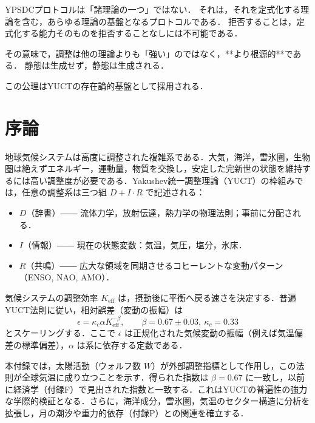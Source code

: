\documentclass[11pt,a4paper]{article}
\newcommand{\Keff}{K_{\mathrm{eff}}}
\newcommand{\kappac}{\kappa_c}
\newcommand{\be}{\beta}
\begin{document}
	YPSDCプロトコルは「諸理論の一つ」ではない．
	それは，それを定式化する理論を含む，あらゆる理論の基盤となるプロトコルである．
	拒否することは，定式化する能力そのものを拒否することなしには不可能である．
	
	その意味で，調整は他の理論よりも「強い」のではなく，**より根源的**である．
	静態は生成せず，静態は生成される．
	
	この公理はYUCTの存在論的基盤として採用される．
	
	\section{序論}
	
	地球気候システムは高度に調整された複雑系である．大気，海洋，雪氷圏，生物圏は絶えずエネルギー，運動量，物質を交換し，安定した完新世の状態を維持するには高い調整度が必要である．Yakushev統一調整理論（YUCT）の枠組みでは，任意の調整系は三つ組 $D + I \cdot R$ で記述される：
	
	\begin{itemize}
		\item $D$（辞書）―― 流体力学，放射伝達，熱力学の物理法則；事前に分配される．
		\item $I$（情報）―― 現在の状態変数：気温，気圧，塩分，氷床．
		\item $R$（共鳴）―― 広大な領域を同期させるコヒーレントな変動パターン（ENSO, NAO, AMO）．
	\end{itemize}
	
	気候システムの調整効率 $\Keff$ は，摂動後に平衡へ戻る速さを決定する．普遍YUCT法則に従い，相対誤差（変動の振幅）は
	\[
	\epsilon = \kappac \alpha \Keff^{-\be}, \qquad \be = 0.67 \pm 0.03,\ \kappac = 0.33
	\]
	とスケーリングする．ここで $\epsilon$ は正規化された気候変動の振幅（例えば気温偏差の標準偏差），$\alpha$ は系に依存する定数である．
	
	本付録では，太陽活動（ウォルフ数 $W$）が外部調整指標として作用し，この法則が全球気温に成り立つことを示す．得られた指数は $\be = 0.67$ に一致し，以前に経済学（付録F）で見出された指数と一致する．これはYUCTの普遍性の強力な学際的検証となる．さらに，海洋成分，雪氷圏，気温のセクター構造に分析を拡張し，月の潮汐や重力的依存（付録P）との関連を確立する．
	
	
\end{document}
